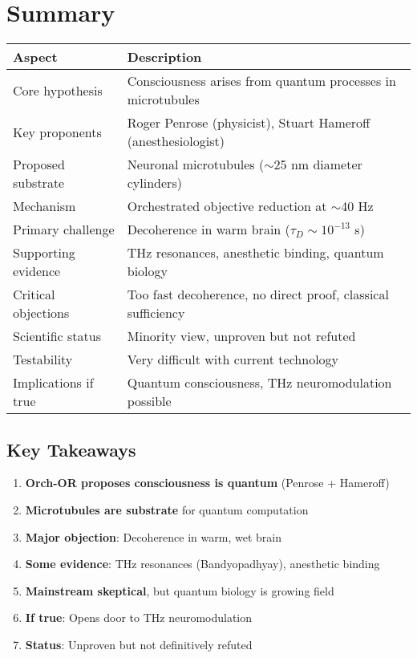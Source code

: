 \section{Summary}

\begin{center}
\begin{tabular}{@{}p{5cm}p{8cm}@{}}
\toprule
\textbf{Aspect} & \textbf{Description} \\
\midrule
Core hypothesis & Consciousness arises from quantum processes in microtubules \\
Key proponents & Roger Penrose (physicist), Stuart Hameroff (anesthesiologist) \\
Proposed substrate & Neuronal microtubules ($\sim$25 nm diameter cylinders) \\
Mechanism & Orchestrated objective reduction at $\sim$40 Hz \\
Primary challenge & Decoherence in warm brain ($\tau_D \sim 10^{-13}$ s) \\
Supporting evidence & THz resonances, anesthetic binding, quantum biology \\
Critical objections & Too fast decoherence, no direct proof, classical sufficiency \\
Scientific status & Minority view, unproven but not refuted \\
Testability & Very difficult with current technology \\
Implications if true & Quantum consciousness, THz neuromodulation possible \\
\bottomrule
\end{tabular}
\end{center}

\subsection{Key Takeaways}

\begin{enumerate}
\def\labelenumi{\arabic{enumi}.}
\tightlist
\item \textbf{Orch-OR proposes consciousness is quantum} (Penrose + Hameroff)
\item \textbf{Microtubules are substrate} for quantum computation
\item \textbf{Major objection}: Decoherence in warm, wet brain
\item \textbf{Some evidence}: THz resonances (Bandyopadhyay), anesthetic binding
\item \textbf{Mainstream skeptical}, but quantum biology is growing field
\item \textbf{If true}: Opens door to THz neuromodulation
\item \textbf{Status}: Unproven but not definitively refuted
\end{enumerate}


